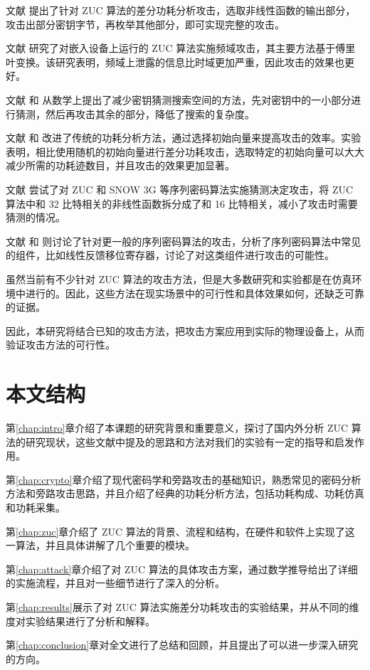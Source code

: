 文献 \parencite{zuc_attack_tangming} 提出了针对 ZUC 算法的差分功耗分析攻击，选取非线性函数的输出部分，攻击出部分密钥字节，再枚举其他部分，即可实现完整的攻击。

文献 \parencite{zuc_freq} 研究了对嵌入设备上运行的 ZUC 算法实施频域攻击，其主要方法基于傅里叶变换。该研究表明，频域上泄露的信息比时域更加严重，因此攻击的效果也更好。

文献 \parencite{zuc_security} 和 \parencite{zuc_analyical} 从数学上提出了减少密钥猜测搜索空间的方法，先对密钥中的一小部分进行猜测，然后再攻击其余的部分，降低了搜索的复杂度。

文献 \parencite{zuc_iv} 和 \parencite{zuc_wu}改进了传统的功耗分析方法，通过选择初始向量来提高攻击的效率。实验表明，相比使用随机的初始向量进行差分功耗攻击，选取特定的初始向量可以大大减少所需的功耗迹数目，并且攻击的效果更加显著。

文献 \parencite{zuc_guess} 尝试了对 ZUC 和 SNOW 3G 等序列密码算法实施猜测决定攻击，将 ZUC 算法中和 32 比特相关的非线性函数拆分成了和 16 比特相关，减小了攻击时需要猜测的情况。

文献 \parencite{stream_fischer} 和 \parencite{stream_gu} 则讨论了针对更一般的序列密码算法的攻击，分析了序列密码算法中常见的组件，比如线性反馈移位寄存器，讨论了对这类组件进行攻击的可能性。

\vspace*{0.5\baselineskip}

虽然当前有不少针对 ZUC 算法的攻击方法，但是大多数研究和实验都是在仿真环境中进行的。因此，这些方法在现实场景中的可行性和具体效果如何，还缺乏可靠的证据。

因此，本研究将结合已知的攻击方法，把攻击方案应用到实际的物理设备上，从而验证攻击方法的可行性。



\section{本文结构}

第\ref{chap:intro}章介绍了本课题的研究背景和重要意义，探讨了国内外分析 ZUC 算法的研究现状，这些文献中提及的思路和方法对我们的实验有一定的指导和启发作用。

第\ref{chap:crypto}章介绍了现代密码学和旁路攻击的基础知识，熟悉常见的密码分析方法和旁路攻击思路，并且介绍了经典的功耗分析方法，包括功耗构成、功耗仿真和功耗采集。

第\ref{chap:zuc}章介绍了 ZUC 算法的背景、流程和结构，在硬件和软件上实现了这一算法，并且具体讲解了几个重要的模块。

第\ref{chap:attack}章介绍了对 ZUC 算法的具体攻击方案，通过数学推导给出了详细的实施流程，并且对一些细节进行了深入的分析。

第\ref{chap:results}展示了对 ZUC 算法实施差分功耗攻击的实验结果，并从不同的维度对实验结果进行了分析和解释。

第\ref{chap:conclusion}章对全文进行了总结和回顾，并且提出了可以进一步深入研究的方向。

